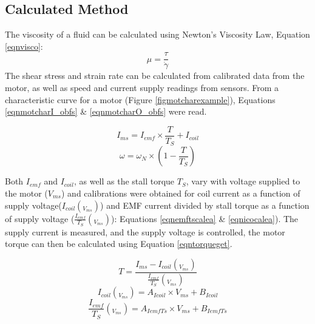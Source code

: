 \documentclass[twoside,a4]{report}
\begin{document}
	\subsection*{Calculated Method}
	The viscosity of a fluid can be calculated using Newton's Viscosity Law, Equation \ref{eqnvisco}:
	\[\mu = \frac{\tau}{\dot{\gamma}}\]
	\newline
	The shear stress and strain rate can be calculated from calibrated data from the motor, as well as speed and current supply readings from sensors. From a characteristic curve for a motor (Figure \ref{figmotcharexample}), Equations \ref{eqnmotcharI_obfs} \& \ref{eqnmotcharO_obfs} were read.
	
	\begin{equation}
		I_{ms} = I_{emf} \times \frac{T}{T_S} + I_{coil}
		\label{eqnmotcharI_obfs}
	\end{equation}
	\begin{equation}
		\omega = \omega_N \times \left(1 - \frac{T}{T_S}\right)
		\label{eqnmotcharO_obfs}
	\end{equation}
	
	\noindent
	Both $I_{emf}$ and $I_{coil}$, as well as the stall torque $T_S$, vary with voltage supplied to the motor ($V_{ms}$) and calibrations were obtained for coil current as a function of supply voltage($I_{coil} (_{V_{ms}})$) and EMF current divided by stall torque as a function of supply voltage ($\frac{I_{emf}}{T_S} (_{V_{ms}})$): Equations \ref{eqnemftscalea} \& \ref{eqnicocalea}). The supply current is measured, and the supply voltage is controlled, the motor torque can then be calculated using Equation \ref{eqntorqueget}.

	\begin{equation}
		T = \frac{I_{ms} - I_{coil} (_{V_{ms}})}{\frac{I_{emf}}{T_S} (_{V_{ms}})}
		\label{eqntorqueget}
	\end{equation}
	\begin{equation}
		I_{coil} (_{V_{ms}}) = A_{Icoil} \times V_{ms} + B_{Icoil}
		\label{eqnicocalea}
	\end{equation}
	\begin{equation}
		\frac{I_{emf}}{T_S} (_{V_{ms}}) = A_{IemfTs} \times V_{ms} + B_{IemfTs}
		\label{eqnemftscalea}
	\end{equation}
	
	
\end{document}

